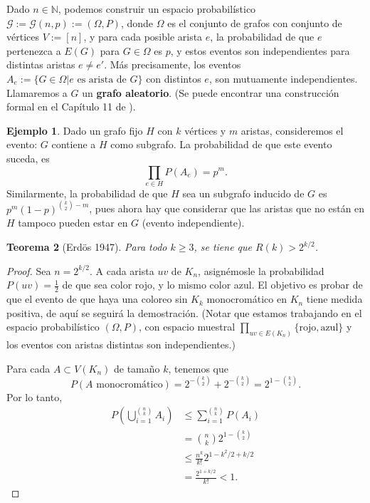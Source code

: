 \documentclass[12pt]{report}
\theoremstyle{plain}
\newtheorem{theorem}{Teorema}[section]
\theoremstyle{definition}
\newtheorem{example}[theorem]{Ejemplo}
\newcommand{\naturals}{\mathbb{N}}
\begin{document}
Dado $n \in \naturals$, podemos construir un espacio probabilístico $\mathcal G:= \mathcal G (n, p) := (\Omega , P)$, donde $\Omega$ es el conjunto de grafos con conjunto de vértices $V:= [n]$, y para cada posible arista $e$, la probabilidad de que $e$ pertenezca a $E(G)$ para $G \in \Omega$ es $p$, y estos eventos son independientes para distintas aristas $e \neq e'$. Más precisamente, los eventos $A_e := \{G \in \Omega | e \text{ es arista de $G$}\}$ con distintos $e$, son mutuamente independientes. Llamaremos a $G$ un \textbf{grafo aleatorio}. (Se puede encontrar una construcción formal en el Capítulo 11 de \cite{diestel2000graphTheory}).

\begin{example}
Dado un grafo fijo $H$ con $k$ vértices y $m$ aristas, consideremos el evento: $G$ contiene a $H$ como subgrafo. La probabilidad de que este evento suceda, es
\[
    \prod_{e \in H} P (A_e) = p^m.
\]
Similarmente, la probabilidad de que $H$ sea un subgrafo inducido de $G$ es $p^m (1-p)^{\binom k 2 - m}$, pues ahora hay que considerar que las aristas que no están en $H$ tampoco pueden estar en $G$ (evento independiente).
\end{example}

\begin{theorem}[Erdös 1947]
Para todo $k \geq 3$, se tiene que $R(k) > 2^{k/2}$.
\end{theorem}
\begin{proof}
Sea $n = 2^{k/2}$. A cada arista $uv$ de $K_n$, asignémosle la probabilidad $P(uv) = \frac 1 2$ de que sea color rojo, y lo mismo color azul. El objetivo es probar de que el evento de que haya una coloreo sin $K_k$ monocromático en $K_n$ tiene medida positiva, de aquí se seguirá la demostración. (Notar que estamos trabajando en el espacio probabilístico $(\Omega, P)$, con espacio muestral $\prod_{uv \in E(K_n)} \{\text{rojo}, \text{azul}\}$ y los eventos con aristas distintas son independientes.)

Para cada $A \subset V(K_n)$ de tamaño $k$, tenemos que
\[
    P(A \text{ monocromático}) = 2^{-\binom k 2} + 2^{- \binom k 2} = 2^{1 - \binom k 2}.
\]
Por lo tanto,
\begin{align*}
P(\bigcup_{i = 1}^{\binom n k} A_i) &\leq \sum_{i = 1}^{\binom n k} P(A_i) \\
&= \binom n k    2^{1 - \binom k 2} \\
&\leq \frac{n^k}{k!} 2^{1 - k^2/2 + k/2} \\
&= \frac{2^{1 + k/2}}{k!} < 1.
\end{align*}
\end{proof}
\end{document}
